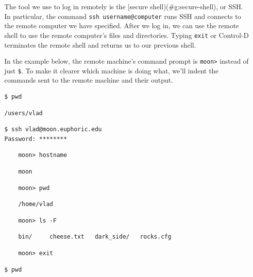 \documentclass[]{book}
\begin{document}
The tool we use to log in remotely is the {[}secure
shell)(\#g:secure-shell), or SSH. In particular, the command
\texttt{ssh username@computer} runs SSH and connects to the remote
computer we have specified. After we log in, we can use the remote shell
to use the remote computer's files and directories. Typing \texttt{exit}
or Control-D terminates the remote shell and returns us to our previous
shell.

In the example below, the remote machine's command prompt is
\texttt{moon\textgreater{}} instead of just \texttt{\$}. To make it
clearer which machine is doing what, we'll indent the commands sent to
the remote machine and their output.

\begin{verbatim}
$ pwd
\end{verbatim}

\begin{verbatim}
/users/vlad
\end{verbatim}

\begin{verbatim}
$ ssh vlad@moon.euphoric.edu
Password: ********
\end{verbatim}

\begin{verbatim}
    moon> hostname
\end{verbatim}

\begin{verbatim}
    moon
\end{verbatim}

\begin{verbatim}
    moon> pwd
\end{verbatim}

\begin{verbatim}
    /home/vlad
\end{verbatim}

\begin{verbatim}
    moon> ls -F
\end{verbatim}

\begin{verbatim}
    bin/     cheese.txt   dark_side/   rocks.cfg
\end{verbatim}

\begin{verbatim}
    moon> exit
\end{verbatim}

\begin{verbatim}
$ pwd
\end{verbatim}
\end{document}
